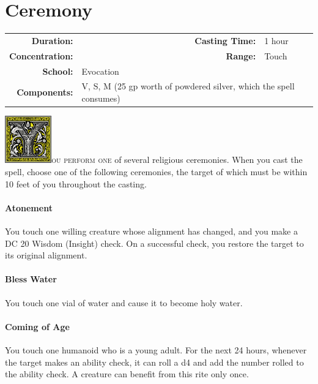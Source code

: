 \documentclass[12pt,showtrims]{memoir}
\begin{document}
\section*{Ceremony}
{
\small\centering\vspace{-6pt}
\begin{tabular}{rlrl}
\toprule

\textbf{Duration:} &  &
\textbf{Casting Time:} & 1 hour \\
\textbf{Concentration:} & &
\textbf{Range:} & Touch \\
\textbf{School:} & Evocation \\
\textbf{Components:} & \multicolumn{3}{p{0.7\textwidth}}{V, S, M (25 gp worth of powdered silver, which the spell consumes)}\\

\bottomrule
\end{tabular}
}
\vspace{1\baselineskip}\noindent
\lettrine[lines=4]{\includegraphics[height=58pt]{initials/Y.png}}{ou perform one} of several religious ceremonies. When you cast the spell, choose one of the following ceremonies, the target of which must be within 10 feet of you throughout the casting.

\paragraph{Atonement} You touch one willing creature whose alignment has changed, and you make a DC 20 Wisdom (Insight) check. On a successful check, you restore the target to its original alignment.

\paragraph{Bless Water} You touch one vial of water and cause it to become holy water.

\paragraph{Coming of Age} You touch one humanoid who is a young adult. For the next 24 hours, whenever the target makes an ability check, it can roll a d4 and add the number rolled to the ability check. A creature can benefit from this rite only once.
\end{document}
